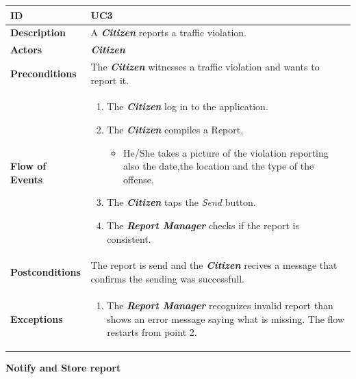 \documentclass{report}
\begin{document}
\begin{tabularx}{\linewidth}{| l | X |}
	\hline
	\textbf{ID} & UC3\\
	
	\hline
	\textbf{Description} & A \textbf{\textit{Citizen}} reports a traffic violation.\\
	
	\hline
	\textbf{Actors} & \textbf{\textit{Citizen}}\\
	
	\hline
	\textbf{Preconditions} & The \textbf{\textit{Citizen}} witnesses a traffic violation and wants to report it.\\
	
	\hline
	\textbf{Flow of Events} & \parbox{0.7\textwidth}{\begin{enumerate}
			\item The \textbf{\textit{Citizen}} log in to the application.
			
			\item The \textbf{\textit{Citizen}} compiles a Report.
			\begin{itemize}
			\item He/She takes a picture of the violation reporting also the date,the location and the type of the offense.			
			\end{itemize}
			\item The \textbf{\textit{Citizen}} taps the \textit{Send} button.	
			\item The \textbf{\textit{Report Manager}} checks if the report is consistent.		
	\end{enumerate}}\\
	
	\hline
	\textbf{Postconditions} & The report is send and the \textbf{\textit{Citizen}} recives a message that confirms the sending was successfull.\\
	
	\hline
	\textbf{Exceptions} & \parbox{0.7\textwidth}{ \begin{enumerate}
			\item The \textbf{\textit{Report Manager}} recognizes invalid report than shows an error message saying what is missing. The flow restarts from point 2. 
		\end{enumerate}}\\
	
	\hline
	
\end{tabularx}
\begin{center}
	\textbf{Notify and Store report}
\end{center}
\end{document}
